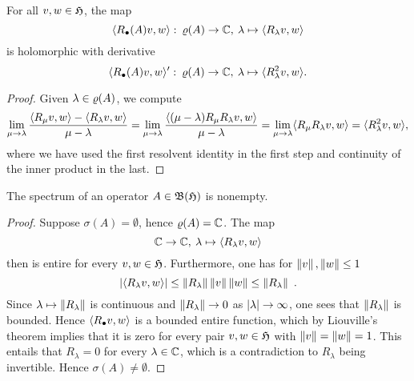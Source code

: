 \begin{proposition}
For all $v, w \in \mathfrak{H}$, the map 
\[
 \langle  R_\bullet (A) v,  w \rangle : \: \varrho(A) \rightarrow \mathbb{C} , \: \lambda \mapsto \langle  R_\lambda v, w \rangle
\]
is holomorphic with derivative
\[
 \langle  R_\bullet (A) v, w \rangle' : \: \varrho(A) \rightarrow \mathbb{C} , \: \lambda \mapsto \langle R_\lambda^2 v,  w \rangle.
\]
\end{proposition}

\begin{proof}
Given $\lambda \in \varrho(A)$, we compute
\begin{align*}
  \lim_{\mu \rightarrow \lambda} \frac{\langle R_\mu v, w \rangle - \langle R_\lambda v,  w \rangle}{\mu - \lambda} =
  \lim_{\mu \rightarrow \lambda} \frac{\langle (\mu - \lambda)R_\mu R_\lambda v,  w \rangle}{\mu - \lambda} =
  \lim_{\mu \rightarrow \lambda} \langle  R_\mu R_\lambda v, w \rangle = \langle R_\lambda^2v , w \rangle,
\end{align*}
where we have used the first resolvent identity in the first step and continuity of the inner product in the last.
\end{proof}

\begin{proposition}
The spectrum of an operator $A \in \mathfrak{B}(\mathfrak{H})$ is nonempty.
\end{proposition}

\begin{proof}
Suppose $\sigma(A) = \emptyset$, hence $\varrho(A) = \mathbb{C}$. The map
\[
\mathbb{C} \to \mathbb{C} , \: \lambda \mapsto \langle R_\lambda v, w \rangle
\]
then is entire for every $v, w \in \mathfrak{H}$. Furthermore, one has  for $\left\|v\right\|, \left\|w\right\| \leq 1$
\[
  \abs{\inprod{R_\lambda v,  w}} \leq  \norm{R_\lambda} \norm{v} \norm{w} \leq \norm{R_\lambda} \ .
\]
Since $\lambda \mapsto \left\|R_\lambda\right\|$ is continuous and $\left\|R_\lambda\right\| \rightarrow 0$ as ${\left|\lambda\right|} \rightarrow \infty$, one sees
that $\left\|R_\lambda\right\|$ is bounded. Hence $\langle R_\bullet v,  w \rangle$ is a bounded entire function, which  by Liouville's theorem implies
that it is zero for every pair $v, w \in \mathfrak{H}$ with $\left\|v\right\| = \left\|w\right\| = 1$.
This entails that $R_\lambda = 0$ for every $\lambda \in \mathbb{C}$, which 
is a contradiction to $R_\lambda$ being invertible. Hence $\sigma(A) \neq \emptyset$.
\end{proof}


